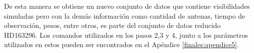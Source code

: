 De esta manera se obtiene un nuevo conjunto de datos que contiene visibilidades simuladas pero con la demás información como cantidad de antenas, tiempo de observación, pesos, entre otros, es parte del conjunto de datos reducido HD163296. Los comandos utilizados en los pasos 2,3 y 4, junto a los parámetros utilizados en estos pueden ser encontrados en el Apéndice \ref{finales:apendice5}. 
